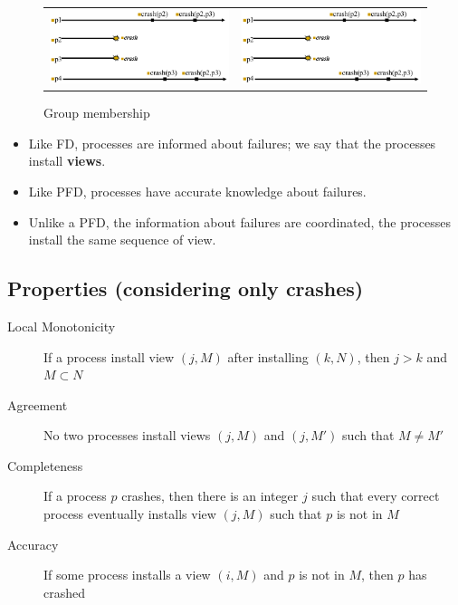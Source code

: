 \begin{figure}[!ht]
    \centering
    \begin{tabular}{cc}
        \includegraphics[width=7cm]{img/gm1.png}&
        \includegraphics[width=7cm]{img/gm1.png}\\
    \end{tabular}
    \caption{Group membership}
\end{figure}
\FloatBarrier{}

\begin{itemize}
	\item Like FD, processes are informed about failures; we say that
	the processes install \textbf{views}.
	\item Like PFD, processes have accurate knowledge about failures.
	\item Unlike a PFD, the information about failures are
	coordinated, the processes install the same sequence of view.
\end{itemize}

\subsection{Properties (considering only crashes)}
\begin{description}
	\item[Local Monotonicity] If a process install view $(j,M)$ after
        installing $(k,N)$, then $j > k$ and $M \subset N$
	\item[Agreement] No two processes install views $(j,M)$ and $(j,M')$ such that
	$M \neq M'$
	\item[Completeness] If a process $p$ crashes, then there is an integer
	$j$ such that every correct process eventually installs view $(j,M)$ such that
	$p$ is not in $M$
	\item[Accuracy] If some process installs a view $(i,M)$ and $p$ is not in $M$,
	then $p$ has crashed
\end{description}

